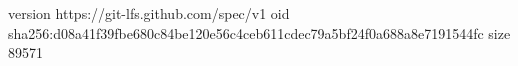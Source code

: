 version https://git-lfs.github.com/spec/v1
oid sha256:d08a41f39fbe680c84be120e56c4ceb611cdec79a5bf24f0a688a8e7191544fc
size 89571
